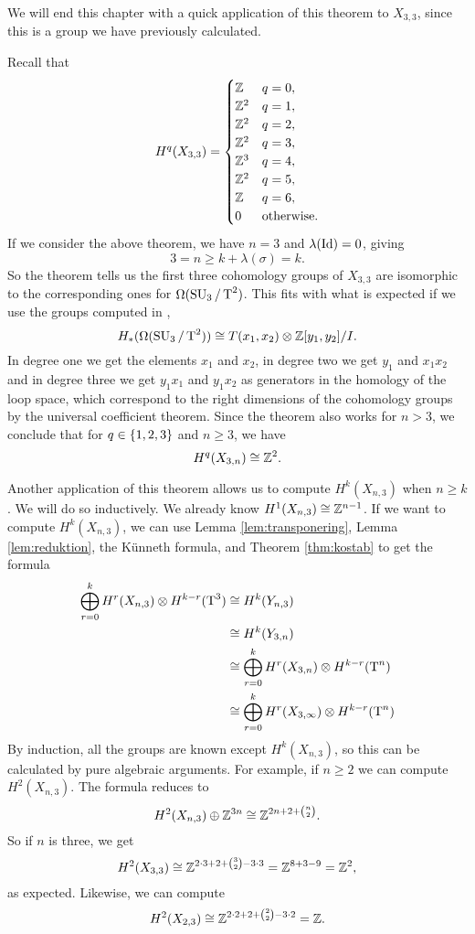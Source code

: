 We will end this chapter with a quick application of this theorem to
$X_{3,3}$, since this is a group we have previously calculated.

\begin{example}
  Recall that
  \[ H^q(X_{3,3}) = \begin{cases}
    \mathbb{Z} & q = 0, \\
    \mathbb{Z}^{2} & q=1, \\
    \mathbb{Z}^{2} & q=2, \\
    \mathbb{Z}^{2} & q=3, \\
    \mathbb{Z}^{3} & q=4, \\
    \mathbb{Z}^{2} & q=5, \\
    \mathbb{Z} & q=6, \\
    0 & \text{otherwise}.
  \end{cases} \]
  If we consider the above theorem, we have $n = 3$ and
  $\lambda(\operatorname{Id}) = 0$, giving
  \[ 3 = n \geq k +\lambda(\sigma) = k. \]
  So the theorem tells us the first three cohomology groups of
  $X_{3,3}$ are isomorphic to the corresponding ones for
  $\Omega(\operatorname{SU}_3/\operatorname{T}^2)$.
  This fits with what is expected if we use the groups computed in
  \cite{grbic},
  \[ H_*(\Omega(\operatorname{SU}_3/\operatorname{T}^2)) \cong T(x_1,x_{2}) \otimes
  \mathbb{Z}[y_1,y_{2}]/I. \]
  In degree one we get the elements $x_1$ and $x_2$, in degree two we
  get $y_1$ and $x_1 x_2$ and in degree three we get $y_1 x_1$ and
  $y_1 x_2$ as generators in the homology of the loop space, which
  correspond to the right dimensions of the cohomology groups by the
  universal coefficient theorem. Since the theorem also works for $n >
  3$, we conclude that for $q\in \left\{ 1,2,3 \right\}$ and $n\geq 3$, we have
  \[ H^q(X_{3,n}) \cong \mathbb{Z}^2. \]
\end{example}

\begin{example}
  Another application of this theorem allows us to compute
  $H^k(X_{n,3})$ when $n \geq k$. We will do so inductively. We
  already know $H^1(X_{n,3}) \cong \mathbb{Z}^{n-1}$. If we want to compute
  $H^k(X_{n,3})$, we can use Lemma \ref{lem:transponering}, Lemma
  \ref{lem:reduktion}, the K\"unneth formula, and Theorem
  \ref{thm:kostab} to get the formula
  \begin{align*}
    \bigoplus_{r=0}^k H^r(X_{n,3}) \otimes H^{k-r}(\operatorname{T}^3) 
    &\cong H^k(Y_{n,3}) \\
    &\cong H^k(Y_{3,n}) \\
    &\cong \bigoplus_{r=0}^k H^r(X_{3,n}) \otimes H^{k-r}(\operatorname{T}^n) \\
    &\cong \bigoplus_{r=0}^k H^r(X_{3,\infty}) \otimes H^{k-r}(\operatorname{T}^n)
  \end{align*}
  By induction, all the groups are known except $H^k(X_{n,3})$, so
  this can be calculated by pure algebraic arguments. For example, if
  $n \geq 2$ we can compute $H^2(X_{n,3})$. The formula reduces to
  \[ H^2(X_{n,3}) \oplus \mathbb{Z}^{3n} \cong \mathbb{Z}^{2n+2+{n\choose 2}}. \]
  So if $n$ is three, we get
  \[ H^2(X_{3,3}) \cong \mathbb{Z}^{2\cdot 3 + 2 + {3\choose 2} - 3\cdot 3} =
  \mathbb{Z}^{8+3-9} = \mathbb{Z}^2, \]
  as expected. Likewise, we can compute
  \[ H^2(X_{2,3}) \cong \mathbb{Z}^{2\cdot 2 + 2 + {2 \choose 2} - 3\cdot 2} =
  \mathbb{Z}. \]
\end{example}

